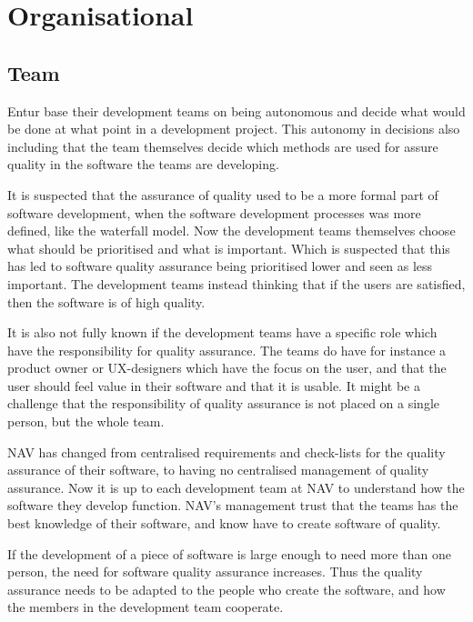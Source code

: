 
\section{Organisational}
\subsection{Team}
Entur base their development teams on being autonomous and decide what would be done at what point in a development project. This autonomy in decisions also including that the team themselves decide which methods are used for assure quality in the software the teams are developing. 

It is suspected that the assurance of quality used to be a more formal part of software development, when the software development processes was more defined, like the waterfall model. Now the development teams themselves choose what should be prioritised and what is important. Which is suspected that this has led to software quality assurance being prioritised lower and seen as less important. The development teams instead thinking that if the users are satisfied, then the software is of high quality.

It is also not fully known if the development teams have a specific role which have the responsibility for quality assurance. The teams do have for instance a product owner or UX-designers which have the focus on the user, and that the user should feel value in their software and that it is usable. It might be a challenge that the responsibility of quality assurance is not placed on a single person, but the whole team.

NAV has changed from centralised requirements and check-lists for the quality assurance of their software, to having no centralised management of quality assurance. Now it is up to each development team at NAV to understand how the software they develop function. NAV's management trust that the teams has the best knowledge of their software, and know have to create software of quality.

If the development of a piece of software is large enough to need more than one person, the need for software quality assurance increases. Thus the quality assurance needs to be adapted to the people who create the software, and how the members in the development team cooperate.

